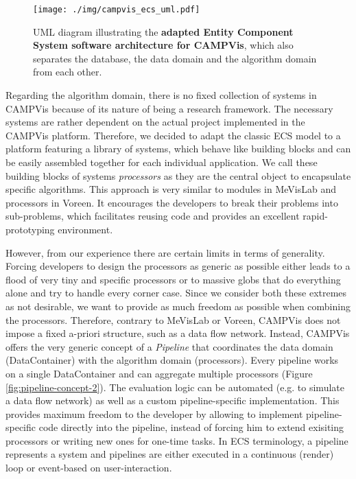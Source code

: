 \begin{figure}[ht]
	\centering
	\texttt{[image: ./img/campvis\_ecs\_uml.pdf]}
	\caption{
		UML diagram illustrating the \textbf{adapted Entity Component System software architecture for CAMPVis}, which also separates the database, the data domain and the algorithm domain from each other.		
	}
	\label{fig:campvis-ecs-uml}
\end{figure}

Regarding the algorithm domain, there is no fixed collection of systems in CAMPVis because of its nature of being a research framework.
The necessary systems are rather dependent on the actual project implemented in the CAMPVis platform.
Therefore, we decided to adapt the classic ECS model to a platform featuring a library of systems, which behave like building blocks and can be easily assembled together for each individual application.
We call these building blocks of systems \emph{processors} as they are the central object to encapsulate specific algorithms. 
This approach is very similar to modules in MeVisLab and processors in Voreen. 
It encourages the developers to break their problems into sub-problems, which facilitates reusing code and provides an excellent rapid-prototyping environment.

However, from our experience there are certain limits in terms of generality. 
Forcing developers to design the processors as generic as possible either leads to a flood of very tiny and specific processors or to massive globs that do everything alone and try to handle every corner case. 
Since we consider both these extremes as not desirable, we want to provide as much freedom as possible when combining the processors.
Therefore, contrary to MeVisLab or Voreen, CAMPVis does not impose a fixed a-priori structure, such as a data flow network.
Instead, CAMPVis offers the very generic concept of a \emph{Pipeline} that coordinates the data domain (DataContainer) with the algorithm domain (processors).
Every pipeline works on a single DataContainer and can aggregate multiple processors (Figure \ref{fig:pipeline-concept-2}).
The evaluation logic can be automated (e.g. to simulate a data flow network) as well as a custom pipeline-specific implementation.
This provides maximum freedom to the developer by allowing to implement pipeline-specific code directly into the pipeline, instead of forcing him to extend exisiting processors or writing new ones for one-time tasks.
In ECS terminology, a pipeline represents a system and pipelines are either executed in a continuous (render) loop or event-based on user-interaction.

